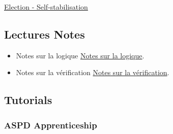 \documentclass[ 12pt]{article}
\begin{document}
\href{http://mery54.github.io/teaching/aspd/lecturesnotes/ASPD5.pdf}{Election
  - Self-stabilisation}




  



  \subsection{Lectures Notes}

  \begin{itemize}
  \item[]   Notes sur la logique
    \href{http://mery54.github.io/teaching/movex/lecturesnotes/preprint-chapterlogique.pdf}{Notes sur la logique}.

     \item[]   Notes sur la vérification
    \href{http://mery54.github.io/teaching/movex/lecturesnotes/preprint-chapterverification.pdf}{Notes sur la vérification}.

  \end{itemize}


  

\subsection{Tutorials}

\subsubsection{ASPD Apprenticeship}
\label{sec:aspd-apprenticeship}
\end{document}
